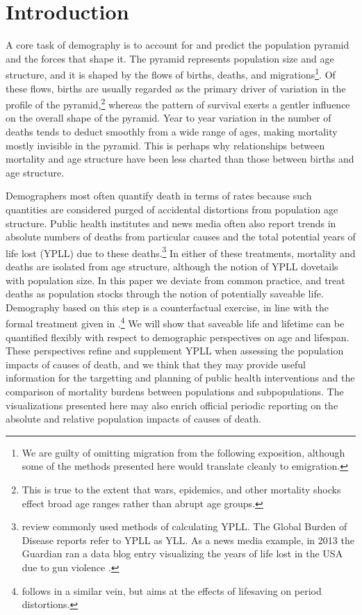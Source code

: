 \documentclass{article}
\begin{document}
\section*{Introduction}
A core task of demography is to account for and predict the population
pyramid and the forces that shape it. The pyramid represents population
size and age structure, and it is shaped by the flows of births,
deaths, and migrations\footnote{We are guilty of omitting migration from
the following exposition, although some of the methods presented here would
translate cleanly to emigration.}. Of these flows, births are usually regarded
as the primary driver of variation in the profile of the pyramid,\footnote{This
is true to the extent that wars, epidemics, and other mortality shocks effect
broad age ranges rather than abrupt age groups.} whereas the pattern of survival
exerts a gentler influence on the overall shape of the pyramid.
Year to year variation in the number of deaths tends to deduct
smoothly from a wide range of ages, making mortality mostly invisible in the
pyramid. This is perhaps why relationships between mortality and age structure
have been less charted than those between births and age structure.

Demographers most often quantify death in terms of rates 
because such quantities are considered purged of accidental distortions from
population age structure. Public health institutes and news media often also
report trends in absolute numbers of deaths from particular causes and the total potential years of life lost (YPLL) due to
these deaths.\footnote{\citet{gardner1990} review commonly used methods of
calculating YPLL. The Global Burden of Disease reports refer to YPLL as YLL.
As a news media example, in 2013 the Guardian ran a data blog entry
visualizing the years of life lost in the USA due to gun violence
\citep{rogers2013gun}. } In either of these treatments, mortality and deaths are
isolated from age structure, although the notion of YPLL dovetails with
population size. In this paper we deviate from common practice, and treat deaths
as population stocks through the notion of potentially saveable life. Demography
based on this step is a counterfactual exercise, in line with the formal treatment given in
\citet{vaupel1987repeated}.\footnote{\citet{vaupel2008lifesaving} follows in a
similar vein, but aims at the effects of lifesaving on period distortions.} We
will show that saveable life and lifetime can be quantified flexibly with respect to demographic perspectives on age and lifespan. These perspectives refine and supplement YPLL when assessing the population impacts of causes of death, and we
think that they may provide useful information for the targetting and planning
of public health interventions and the comparison of mortality burdens between
populations and subpopulations. The visualizations presented here may also
enrich official periodic reporting on the absolute and relative population
impacts of causes of death.
\end{document}
